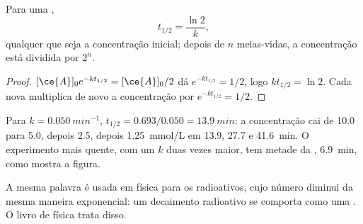 \begin{proposition}\label{prop:g12:reaction-rates:half-life}
Para uma ,
\[
  t_{1/2} = \frac{\ln 2}{k},
\]
qualquer que seja a concentração inicial; depois de $n$ meias-vidas, a
concentração está dividida por $2^n$.
\end{proposition}

\begin{proof}
$[\ce{A}]_0 e^{-k t_{1/2}} = [\ce{A}]_0 / 2$ dá $e^{-k t_{1/2}} = 1/2$,
logo $k t_{1/2} = \ln 2$. Cada nova  multiplica de novo a
concentração por $e^{-k t_{1/2}} = 1/2$.
\end{proof}


\begin{example}\label{ex:g12:reaction-rates:half-lives}
Para $k = \qty{0.050}{min^{-1}}$, $t_{1/2} = 0.693 / 0.050 =
\qty{13.9}{min}$: a concentração cai de 10.0 para 5.0, depois 2.5, depois
\qty{1.25}{mmol/L} em 13.9, 27.7 e \qty{41.6}{min}. O experimento mais
quente, com um $k$ duas vezes maior, tem metade da ,
\qty{6.9}{min}, como mostra a figura.
\end{example}

\begin{remark}\label{rem:g12:reaction-rates:radioactive}
A mesma palavra é usada em física para os  radioativos, cujo
número diminui da mesma maneira exponencial: um decaimento radioativo se
comporta como uma . O livro de física trata
disso.
\end{remark}

